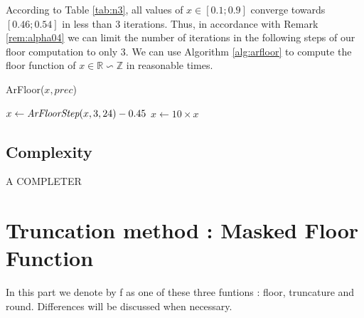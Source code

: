 \documentclass[runningheads]{llncs}
\begin{document}
According to Table \ref{tab:n3}, all values of $x\in[\num{0.1};\num{0.9}]$ converge towards $[\num{0.46};\num{0.54}]$ in less than $3$ iterations. Thus, in accordance with Remark \ref{rem:alpha04} we can limit the number of iterations in the following steps of our floor computation to only $3$. We can use Algorithm \ref{alg:arfloor} to compute the floor function of $x\in\mathbb{R}\backsim\mathbb{Z}$ in reasonable times.

\begin{algorithm}[H]
  \caption{ArFloor($x,prec$)}
  \label{alg:arfloor}
  $x\leftarrow \emph{ArFloorStep}(x,3,24) -\num{0.45}$\;
  $x \leftarrow 10 \times x$\;
\end{algorithm}

\subsection{Complexity}
A COMPLETER

\section{Truncation method : Masked Floor Function}
In this part we denote by f as one of these three funtions : floor, truncature and round. Differences will be discussed when necessary.
\end{document}
